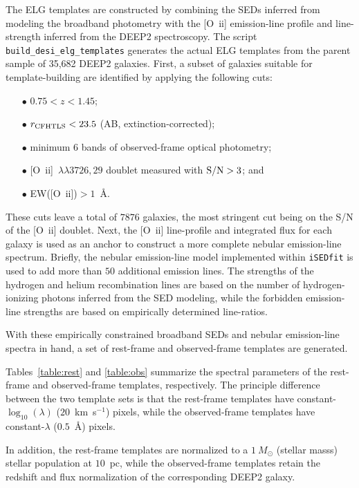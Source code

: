 \documentclass[11pt]{article}
\newcommand{\oii}{[O~{\sc ii}]}
\newcommand{\oiilam}{[O~{\sc ii}]~\ensuremath{\lambda\lambda3726,29}}
\begin{document}
The ELG templates are constructed by combining the SEDs inferred from
modeling the broadband photometry with the \oii{} emission-line
profile and line-strength inferred from the DEEP2 spectroscopy.  The
script {\tt build\_desi\_elg\_templates} generates the actual ELG
templates from the parent sample of 35,682 DEEP2 galaxies.  First, a
subset of galaxies suitable for template-building are identified by
applying the following cuts:

\begin{enumerate}
\item[$\bullet$]{$0.75<z<1.45$;}
\item[$\bullet$]{$r_{\rm CFHTLS}<23.5$ (AB, extinction-corrected);}
\item[$\bullet$]{minimum 6 bands of observed-frame optical photometry;}
\item[$\bullet$]{\oiilam{} doublet measured with ${\rm S/N}>3$; and}
\item[$\bullet$]{EW(\oii)$>1$~\AA.}
\end{enumerate}

These cuts leave a total of $7876$ galaxies, the most stringent cut
being on the S/N of the \oii{} doublet.  Next, the \oii{} line-profile
and integrated flux for each galaxy is used as an anchor to construct
a more complete nebular emission-line spectrum.  Briefly, the nebular
emission-line model implemented within {\tt iSEDfit} is used to add
more than $50$ additional emission lines.  The strengths of the
hydrogen and helium recombination lines are based on the number of
hydrogen-ionizing photons inferred from the SED modeling, while the
forbidden emission-line strengths are based on empirically determined
line-ratios.

With these empirically constrained broadband SEDs and nebular
emission-line spectra in hand, a set of rest-frame and observed-frame
templates are generated.  

Tables~\ref{table:rest} and \ref{table:obs} summarize the spectral parameters of
the rest-frame and observed-frame templates, respectively.  The principle
difference between the two template sets is that the rest-frame templates have
constant-$\log_{10}(\lambda)$ ($20$~km~s$^{-1}$) pixels, while the
observed-frame templates have constant-$\lambda$ ($0.5$~\AA) pixels.  

In addition, the rest-frame templates are normalized to a $1~M_{\odot}$ (stellar
masss) stellar population at $10$~pc, while the observed-frame templates retain
the redshift and flux normalization of the corresponding DEEP2 galaxy.
\end{document}
